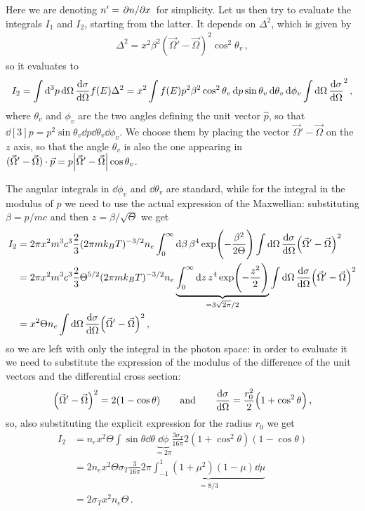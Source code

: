 \documentclass[main.tex]{subfiles}
\begin{document}
Here we are denoting \(n' = \pdv*{n}{x}\) for simplicity.  
Let us then try to evaluate the integrals \(I_1 \) and \(I_2 \), starting from the latter. It depends on \(\Delta^2\), which is given by 
%
\begin{align}
\Delta^2 = x^2 \beta^2 (\vec{\Omega}' - \vec{\Omega})^2 \cos^2 \theta_v
\,,
\end{align}
%
so it evaluates to 
%
\begin{align}
I_2 = 
\int \dd[3]{p} \dd{\Omega } \dv{\sigma }{\Omega } f(E) \Delta^2
= x^2 \int f(E) p^2 \beta^2 \cos^2 \theta _v \dd{p} \sin \theta _v \dd{\theta _v} \dd{\phi _v} \int \dd{\Omega } \dv{\sigma }{\Omega } (\vec{\Omega}' - \vec{\Omega})^2
\,,
\end{align}
%
where \(\theta _v\) and \(\phi _v\) are the two angles defining the unit vector \(\hat{p}\), so that \(\dd[3]{p} = p^2 \sin \theta _v \dd{p } \dd{\theta _v} \dd{\phi _v}\). We choose them by placing the vector \(\vec{\Omega}' - \vec{\Omega}\) on the \(z\) axis, so that the angle \(\theta _v\) is also the one appearing in \((\vec{\Omega}' - \vec{\Omega}) \cdot \vec{p} = p \abs{\vec{\Omega}' - \vec{\Omega}} \cos \theta _v\). 

The angular integrals in \(\dd{\phi _v}\) and \(\dd{\theta _v}\) are standard, while for the integral in the modulus of \(p\) we need to use the actual expression of the Maxwellian: substituting \(\beta = p / mc\) and then \(z= \beta / \sqrt{\Theta }\) we get 
%
\begin{align}
I_2 
&= 2 \pi x^2m^3 c^3 \frac{2}{3} (2 \pi m k_B T)^{-3/2} n_e 
\int_0^{\infty } \dd{\beta } \beta^{4} \exp(- \frac{\beta^2}{2 \Theta })
\int \dd{\Omega } \dv{\sigma }{\Omega } \qty(\vec{\Omega}' - \vec{\Omega})^2 \\
&= 2 \pi x^2m^3 c^3 \frac{2}{3} \Theta^{5/2} (2 \pi m k_B T)^{-3/2} n_e 
\underbrace{\int_0^{\infty } \dd{z } z^{4} \exp(- \frac{z^2}{2})}_{= 3 \sqrt{2 \pi } / 2}
\int \dd{\Omega } \dv{\sigma }{\Omega } \qty(\vec{\Omega}' - \vec{\Omega})^2   \\
&= x^2 \Theta n_e 
\int \dd{\Omega } \dv{\sigma }{\Omega } \qty(\vec{\Omega}' - \vec{\Omega})^2
\,,
\end{align}
%
so we are left with only the integral in the photon space: in order to evaluate it we need to substitute the expression of the modulus of the difference of the unit vectors and the differential cross section: 
%
\begin{align}
\qty(\vec{\Omega}' - \vec{\Omega})^2 = 2 (1 - \cos \theta )
\qquad \text{and} \qquad
\dv{\sigma }{\Omega } = \frac{r_0^2}{2} \qty(1 + \cos^2 \theta )
\,,
\end{align}
%
so, also substituting the explicit expression for the radius \(r_0 \) we get 
%
\begin{align}
I_2 &= n_e x^2 \Theta \int \sin \theta \dd{\theta } \underbrace{\dd{\phi }}_{= 2 \pi } \frac{3 \sigma _T}{16 \pi } 2 (1 + \cos^2 \theta ) (1 - \cos \theta )  \\
&= 2 n_e x^2 \Theta \sigma _T \frac{3}{16 \pi } 2 \pi \underbrace{\int_{-1}^{1} (1+\mu^2) (1 - \mu ) \dd{\mu }}_{= 8/3} \\
&= 2 \sigma _T x^2 n_e \Theta 
\,.
\end{align}
\end{document}
